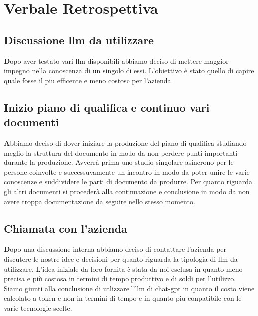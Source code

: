 \documentclass{article}
\begin{document}
\newpage
\section{Verbale Retrospettiva}

    \subsection{Discussione llm da utilizzare}
    \textbf Dopo aver testato vari llm disponibili abbiamo deciso di mettere maggior impegno nella conoscenza di un singolo di essi. L'obiettivo è stato quello di capire quale fosse il piu efficente e meno costoso per l'azienda.

    \subsection{Inizio piano di qualifica e continuo vari documenti}
    \textbf Abbiamo deciso di dover iniziare la produzione del piano di qualifica studiando meglio la struttura del documento in modo da non perdere punti importanti durante la produzione. Avverrà prima uno studio singolare asincrono per le persone coinvolte e successuvamente un incontro in modo da poter unire le varie conoscenze e suddividere le parti di documento da produrre. Per quanto riguarda gli altri documenti si procederà alla continuazione e conclusione in modo da non avere troppa documentazione da seguire nello stesso momento.

    \subsection{Chiamata con l'azienda}
    \textbf Dopo una discussione interna abbiamo deciso di contattare l'azienda per discutere le nostre idee e decisioni per quanto riguarda la tipologia di llm da utilizzare. L'idea iniziale da loro fornita è stata da noi esclusa in quanto meno precisa e più costosa in termini di tempo produttivo e di soldi per l'utilizzo. Siamo giunti alla conclusione di utlizzare l'llm di chat-gpt in quanto il costo viene calcolato a token e non in termini di tempo e in quanto piu conpatibile con le varie tecnologie scelte.
    
\end{document}
